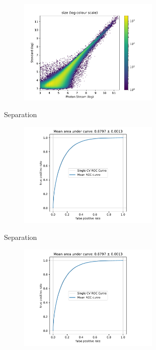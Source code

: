 \begin{frame}[t]
    \begin{figure}
        \centering
        \includegraphics[width=0.6\textwidth]{fig/size_compare.pdf}
    \end{figure}
\end{frame}

\begin{frame}[t]{Separation}
    \begin{figure}
        \centering
        \includegraphics[width=0.6\textwidth,page=2]{fig/separation_performance.pdf}
    \end{figure}
\end{frame}

\begin{frame}[t]{Separation}
    \begin{figure}
        \centering
        \includegraphics[width=0.6\textwidth,page=3]{fig/separation_performance.pdf}
    \end{figure}
\end{frame}

